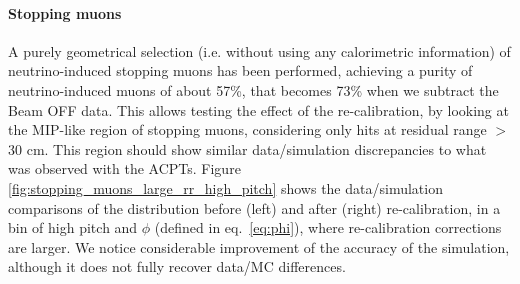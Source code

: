 \paragraph{Stopping muons}
A purely geometrical selection (i.e. without using any calorimetric information) of neutrino-induced stopping muons has been performed, achieving a purity of neutrino-induced muons of about 57\%, that becomes 73\% when we subtract the Beam OFF data.
This allows testing the effect of the re-calibration, by looking at the MIP-like region of stopping muons, considering only hits at residual range $>$ 30 cm.
This region should show similar data/simulation discrepancies to what was observed with the ACPTs.
Figure \ref{fig:stopping_muons_large_rr_high_pitch} shows the data/simulation comparisons of the \dqdx distribution before (left) and after (right) re-calibration, in a bin of high pitch and $\phi$ (defined in eq.~\ref{eq:phi}), where re-calibration corrections are larger.
We notice considerable improvement of the accuracy of the simulation, although it does not fully recover data/MC differences.

